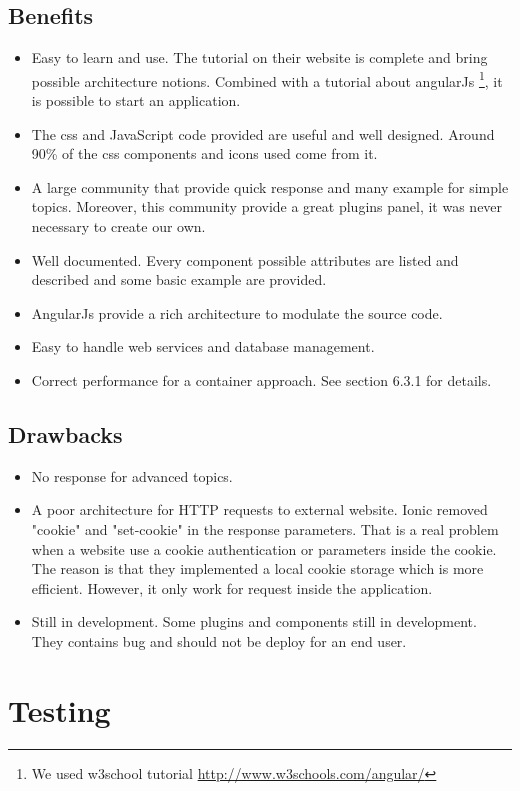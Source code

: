 \documentclass{eplmastersthesis}
\begin{document}
\subsection{Benefits}
\begin{itemize}
\item Easy to learn and use. The tutorial on their website is complete and bring possible architecture notions. Combined with a tutorial about angularJs \footnote{We used w3school tutorial \url{http://www.w3schools.com/angular/}}, it is possible to start an application. 
\item The css and JavaScript code provided are useful and well designed. Around 90\% of the css components and icons used come from it.
\item A large community that provide quick response and many example for simple topics. Moreover, this community provide a great plugins panel, it was never necessary to create our own. 
\item Well documented. Every component possible attributes are listed and described and some basic example are provided.
\item AngularJs provide a rich architecture to modulate the source code. 
\item Easy to handle web services and database management. 
\item Correct performance for a container approach. See section 6.3.1 for details.
\end{itemize}
\subsection{Drawbacks}
\begin{itemize}
\item No response for advanced topics. 
\item A poor architecture for HTTP requests to external website. Ionic removed "cookie" and "set-cookie" in the response parameters. That is a real problem when a website use a cookie authentication or parameters inside the cookie. The reason is that they implemented a local cookie storage which is more efficient. However, it only work for request inside the application.
\item Still in development. Some plugins and components still in development. They contains bug and should not be deploy for an end user. 
\end{itemize}


\section{Testing}
\end{document}
